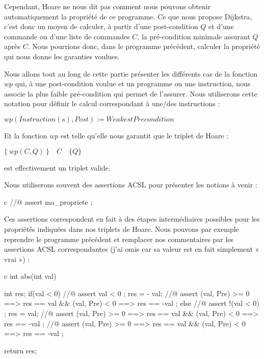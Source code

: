 \documentclass[middle]{zmdocument}
\begin{document}
Cependant, Hoare ne nous dit pas comment nous pouvons obtenir automatiquement la 
propriété  de ce programme. Ce que nous propose Dijkstra, c'est donc un moyen
de calculer, à partir d'une post-condition $Q$ et d'une commande ou d'une liste de 
commandes $C$, la pré-condition minimale assurant $Q$ après $C$. Nous pourrions 
donc, dans le programme précédent, calculer la propriété  qui nous donne les
garanties voulues.



Nous allons tout au long de cette partie présenter les différents cas de la 
fonction $wp$ qui, à une post-condition voulue et un programme ou une instruction,
nous associe la plus faible pré-condition qui permet de l'assurer. Nous utiliserons
cette notation pour définir le calcul correspondant à une/des instructions :



$wp(Instruction(s), Post) := WeakestPrecondition$



Et la fonction $wp$ est telle qu'elle nous garantit que le triplet de Hoare :




\begin{center}
$\{\ wp(C,Q)\ \}\quad C\quad \{ Q \}$


\end{center}


est effectivement un triplet valide.



Nous utiliserons souvent des assertions ACSL pour présenter les notions à 
venir :



\begin{CodeBlock}{c}
//@ assert ma_propriete ;
\end{CodeBlock}



Ces assertions correspondent en fait à des étapes intermédiaires possibles pour
les propriétés indiquées dans nos triplets de Hoare. Nous pouvons par exemple
reprendre le programme précédent et remplacer nos commentaires par les assertions
ACSL correspondantes (j'ai omis  car sa valeur est en fait simplement
« vrai ») :



\begin{CodeBlock}{c}
int abs(int val){
  int res;
  if(val < 0){
    //@ assert val < 0 ;
    res = - val;
    //@ assert \at(val, Pre) >= 0 ==> res == val && \at(val, Pre) < 0 ==> res == -val ;
  } else {
    //@ assert !(val < 0) ;
    res = val;
    //@ assert \at(val, Pre) >= 0 ==> res == val && \at(val, Pre) < 0 ==> res == -val ;
  }
  //@ assert \at(val, Pre) >= 0 ==> res == val && \at(val, Pre) < 0 ==> res == -val ;

  return res;
}
\end{CodeBlock}
\end{document}
